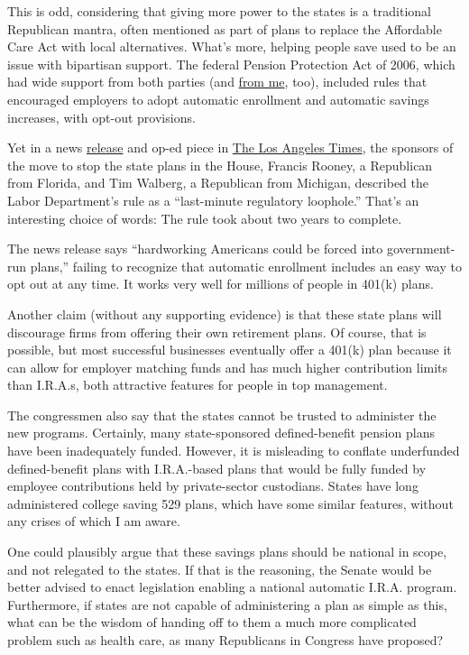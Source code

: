 This is odd, considering that giving more power to the states is a
traditional Republican mantra, often mentioned as part of plans to
replace the Affordable Care Act with local alternatives. What's more,
helping people save used to be an issue with bipartisan support. The
federal Pension Protection Act of 2006, which had wide support from both
parties (and
\href{http://www.nytimes3xbfgragh.onion/2007/02/14/opinion/15talkingpoints.html}{from
me}, too), included rules that encouraged employers to adopt automatic
enrollment and automatic savings increases, with opt-out provisions.

Yet in a news
\href{http://edworkforce.house.gov/news/documentsingle.aspx?DocumentID=401321}{release}
and op-ed piece in
\href{http://www.latimes.com/opinion/opinion-la/la-ed-state-ira-blowback-20170213-story.html}{The
Los Angeles Times}, the sponsors of the move to stop the state plans in
the House, Francis Rooney, a Republican from Florida, and Tim Walberg, a
Republican from Michigan, described the Labor Department's rule as a
``last-minute regulatory loophole.'' That's an interesting choice of
words: The rule took about two years to complete.

The news release says ``hardworking Americans could be forced into
government-run plans,'' failing to recognize that automatic enrollment
includes an easy way to opt out at any time. It works very well for
millions of people in 401(k) plans.

Another claim (without any supporting evidence) is that these state
plans will discourage firms from offering their own retirement plans. Of
course, that is possible, but most successful businesses eventually
offer a 401(k) plan because it can allow for employer matching funds and
has much higher contribution limits than I.R.A.s, both attractive
features for people in top management.

The congressmen also say that the states cannot be trusted to administer
the new programs. Certainly, many state-sponsored defined-benefit
pension plans have been inadequately funded. However, it is misleading
to conflate underfunded defined-benefit plans with I.R.A.-based plans
that would be fully funded by employee contributions held by
private-sector custodians. States have long administered college saving
529 plans, which have some similar features, without any crises of which
I am aware.

One could plausibly argue that these savings plans should be national in
scope, and not relegated to the states. If that is the reasoning, the
Senate would be better advised to enact legislation enabling a national
automatic I.R.A. program. Furthermore, if states are not capable of
administering a plan as simple as this, what can be the wisdom of
handing off to them a much more complicated problem such as health care,
as many Republicans in Congress have proposed?

